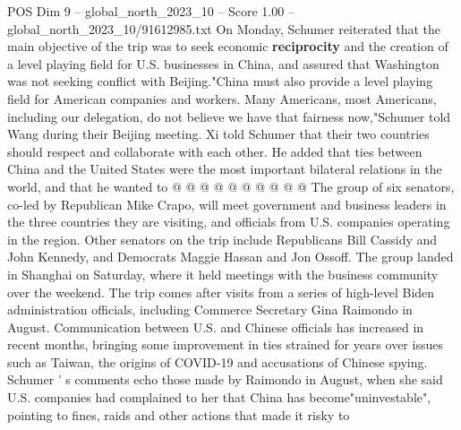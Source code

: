 \begin{textsample}{POS Dim 9 – global\_north\_2023\_10 – Score 1.00 – global\_north\_2023\_10/91612985.txt}
On Monday, Schumer reiterated that the main objective of the trip was to seek economic \textbf{reciprocity} and the creation of a level playing field for U.S. businesses in China, and assured that Washington was not seeking conflict with Beijing."China must also provide a level playing field for American companies and workers.
Many Americans, most Americans, including our delegation, do not believe we have that fairness now,"Schumer told Wang during their Beijing meeting.
Xi told Schumer that their two countries should respect and collaborate with each other.
He added that ties between China and the United States were the most important bilateral relations in the world, and that he wanted to @ @ @ @ @ @ @ @ @ @ The group of six senators, co-led by Republican Mike Crapo, will meet government and business leaders in the three countries they are visiting, and officials from U.S. companies operating in the region.
Other senators on the trip include Republicans Bill Cassidy and John Kennedy, and Democrats Maggie Hassan and Jon Ossoff.
The group landed in Shanghai on Saturday, where it held meetings with the business community over the weekend.
The trip comes after visits from a series of high-level Biden administration officials, including Commerce Secretary Gina Raimondo in August.
Communication between U.S. and Chinese officials has increased in recent months, bringing some improvement in ties strained for years over issues such as Taiwan, the origins of COVID-19 and accusations of Chinese spying.
Schumer ' s comments echo those made by Raimondo in August, when she said U.S. companies had complained to her that China has become"uninvestable", pointing to fines, raids and other actions that made it risky to

\end{textsample}
